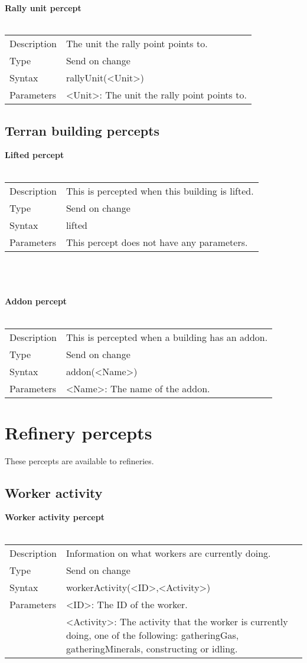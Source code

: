 \documentclass[english,11pt]{report}
\begin{document}
\textbf{Rally unit percept}\\
\\
\begin{tabularx}{\textwidth}{lX}
 Description & The unit the rally point points to. \\
 Type & Send on change \\
 Syntax & rallyUnit(<Unit>) \\
 Parameters &   <Unit>: The unit the rally point points to.
\end{tabularx}

\subsection{Terran building percepts}
\textbf{Lifted percept}\\
\\
\begin{tabularx}{\textwidth}{lX}
 Description & This is percepted when this building is lifted. \\
 Type & Send on change \\
 Syntax & lifted \\
 Parameters &   This percept does not have any parameters.
\end{tabularx}\\
\\
\\
\textbf{Addon percept}\\
\\
\begin{tabularx}{\textwidth}{lX}
 Description & This is percepted when a building has an addon. \\
 Type & Send on change \\
 Syntax & addon(<Name>) \\
 Parameters &  <Name>: The name of the addon.
\end{tabularx}

\newpage
\section{Refinery percepts}
These percepts are available to refineries.

\subsection{Worker activity}
\textbf{Worker activity percept}\\
\\
\begin{tabularx}{\textwidth}{lX}
 Description & Information on what workers are currently doing. \\
 Type & Send on change \\
 Syntax & workerActivity(<ID>,<Activity>) \\
 Parameters &   <ID>: The ID of the worker.\\
            &   <Activity>: The activity that the worker is currently doing, one of the following: gatheringGas, gatheringMinerals, constructing or idling.
\end{tabularx}
\end{document}
